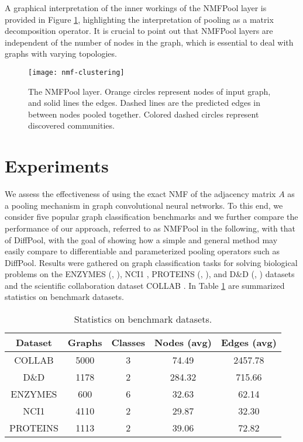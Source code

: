\documentclass[runningheads]{llncs}
\begin{document}
A graphical interpretation of the inner workings of the NMFPool layer is provided in Figure \ref{figPool}, highlighting the interpretation of pooling as a matrix decomposition operator. It is crucial to point out that NMFPool layers are independent of the number of nodes in the graph, which is essential to deal with graphs with varying topologies.
\begin{figure}
\centering
\texttt{[image: nmf-clustering]}
\caption{The NMFPool layer. Orange circles represent nodes of input graph, and solid lines the edges. Dashed lines are the predicted edges in between nodes pooled together. Colored dashed circles represent discovered communities.} \label{figPool}
\end{figure}



\section{Experiments}

We assess the effectiveness of using the exact NMF of the adjacency matrix $A$ as a pooling mechanism in graph convolutional neural networks. To this end, we consider five popular graph classification benchmarks and we further compare the performance of our approach, referred to as NMFPool in the following,  with that of DiffPool, with the goal of showing how a simple and general method may easily compare to differentiable and parameterized pooling operators such as DiffPool. Results were gathered on graph classification tasks for solving biological problems on the ENZYMES (\cite{borgwardt2005protein}, \cite{brenda_enzymes}),  NCI1 \cite{Wale:2008:CDS:1357641.1357642}, PROTEINS (\cite{borgwardt2005protein}, \cite{DOBSON2003771}), and D\&D (\cite{DOBSON2003771}, \cite{Shervashidze:2011:WGK:1953048.2078187}) datasets and the scientific collaboration dataset COLLAB \cite{Yanardag:2015:DGK:2783258.2783417}. In Table \ref{table-datasets} are summarized statistics on benchmark datasets.

\begin{table}
\centering
\caption{Statistics on benchmark datasets.}\label{table-datasets}
\begin{tabular}{ccccc} \toprule[1.5pt]
    {\bfseries{Dataset}} & {\bfseries{Graphs}} & {\bfseries{Classes}} & {\bfseries{Nodes (avg)}} & {\bfseries{Edges (avg)}} \\ \midrule
    {COLLAB} & 5000 & 3 & 74.49 & 2457.78 \\
    {D\&D} & 1178 & 2 & 284.32 & 715.66 \\
    {ENZYMES} & 600  & 6 & 32.63 & 62.14   \\
    {NCI1} & 4110 & 2 & 29.87 & 32.30 \\
    {PROTEINS} & 	1113 & 2 & 39.06 & 72.82 \\ \bottomrule[1.5pt]

\end{tabular}
\end{table}
\end{document}
